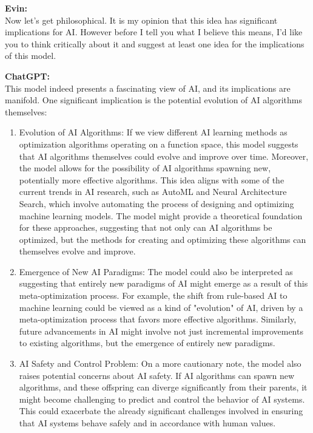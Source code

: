 \documentclass{article}[10pt]
\begin{document}
\noindent \textbf{Evin:}\\
Now let's get philosophical. 
It is my opinion that this idea has significant implications for AI. 
However before I tell you what I believe this means, I'd like you to think critically about it and suggest at least one idea for the implications of this model.\par


\noindent \textbf{ChatGPT:}\\
This model indeed presents a fascinating view of AI, and its implications are manifold. 
One significant implication is the potential evolution of AI algorithms themselves:\par
\begin{enumerate}
    \item Evolution of AI Algorithms: If we view different AI learning methods as optimization algorithms operating on a function space, this model suggests that AI algorithms themselves could evolve and improve over time. 
    Moreover, the model allows for the possibility of AI algorithms spawning new, potentially more effective algorithms. 
    This idea aligns with some of the current trends in AI research, such as AutoML and Neural Architecture Search, which involve automating the process of designing and optimizing machine learning models. 
    The model might provide a theoretical foundation for these approaches, suggesting that not only can AI algorithms be optimized, but the methods for creating and optimizing these algorithms can themselves evolve and improve.
    \item Emergence of New AI Paradigms: The model could also be interpreted as suggesting that entirely new paradigms of AI might emerge as a result of this meta-optimization process. 
    For example, the shift from rule-based AI to machine learning could be viewed as a kind of "evolution" of AI, driven by a meta-optimization process that favors more effective algorithms. 
    Similarly, future advancements in AI might involve not just incremental improvements to existing algorithms, but the emergence of entirely new paradigms.
    \item AI Safety and Control Problem: On a more cautionary note, the model also raises potential concerns about AI safety. 
    If AI algorithms can spawn new algorithms, and these offspring can diverge significantly from their parents, it might become challenging to predict and control the behavior of AI systems. 
    This could exacerbate the already significant challenges involved in ensuring that AI systems behave safely and in accordance with human values.
\end{enumerate}
\end{document}
